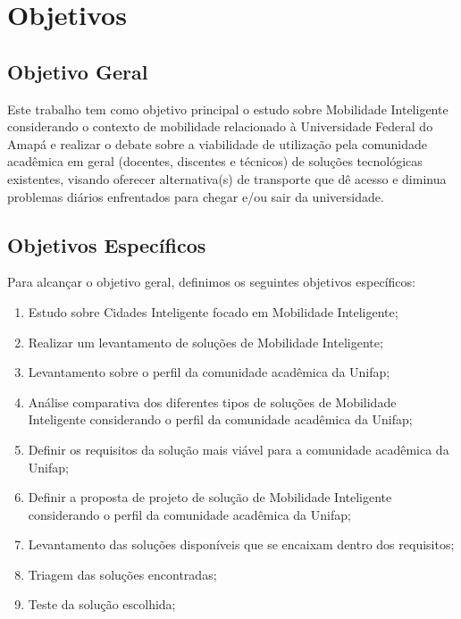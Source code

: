 \section {Objetivos}

\subsection{Objetivo Geral}

Este trabalho tem como objetivo principal o estudo sobre Mobilidade Inteligente
considerando o contexto de mobilidade relacionado à Universidade Federal do Amapá
e realizar o debate sobre a viabilidade de utilização pela comunidade acadêmica em geral (docentes, discentes e técnicos) de soluções tecnológicas existentes, visando oferecer alternativa(s) de transporte que dê acesso e diminua problemas diários enfrentados para chegar e/ou sair da universidade.

\subsection{Objetivos Específicos}

Para alcançar o objetivo geral, definimos os seguintes objetivos específicos:

\begin{enumerate}
\item Estudo sobre Cidades Inteligente focado em Mobilidade Inteligente;
\item Realizar um levantamento de soluções de Mobilidade Inteligente;
\item Levantamento sobre o perfil da comunidade acadêmica da Unifap;
\item Análise comparativa dos diferentes tipos de soluções de Mobilidade Inteligente considerando o perfil da comunidade acadêmica da Unifap;
\item Definir os requisitos da solução mais viável para a comunidade acadêmica da Unifap;
\item Definir a proposta de projeto de solução de Mobilidade Inteligente considerando o perfil da comunidade acadêmica da Unifap;
\item Levantamento das soluções disponíveis que se encaixam dentro dos requisitos;
\item Triagem das soluções encontradas;
\item Teste da solução escolhida;

\end{enumerate}

